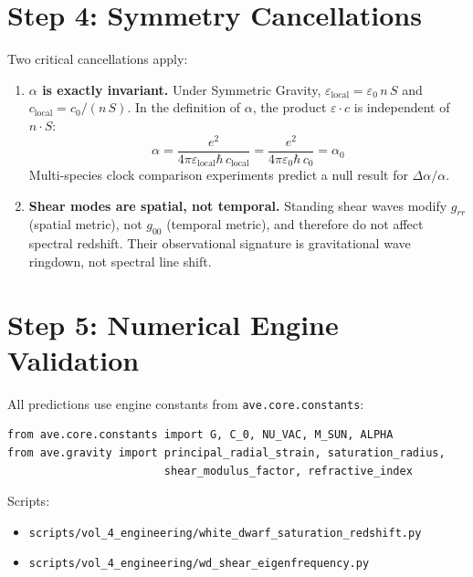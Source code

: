 \section{Step 4: Symmetry Cancellations}



\noindent
Two critical cancellations apply:

\begin{enumerate}
    \item \textbf{$\alpha$ is exactly invariant.}
    Under Symmetric Gravity, $\varepsilon_{\text{local}} = \varepsilon_0 \, n \, S$
    and $c_{\text{local}} = c_0 / (n \, S)$.
    In the definition of $\alpha$, the product $\varepsilon \cdot c$ is independent of $n \cdot S$:
    \begin{equation}
        \alpha = \frac{e^2}{4\pi \varepsilon_{\text{local}} \hbar \, c_{\text{local}}}
               = \frac{e^2}{4\pi \varepsilon_0 \hbar \, c_0} = \alpha_0
    \end{equation}
    Multi-species clock comparison experiments predict a null result for $\Delta\alpha / \alpha$.

    \item \textbf{Shear modes are spatial, not temporal.}
    Standing shear waves modify $g_{rr}$ (spatial metric),
    not $g_{00}$ (temporal metric), and therefore do not affect spectral redshift.
    Their observational signature is gravitational wave ringdown,
    not spectral line shift.
\end{enumerate}

\section{Step 5: Numerical Engine Validation}

All predictions use engine constants from \texttt{ave.core.constants}:
\begin{verbatim}
from ave.core.constants import G, C_0, NU_VAC, M_SUN, ALPHA
from ave.gravity import principal_radial_strain, saturation_radius,
                        shear_modulus_factor, refractive_index
\end{verbatim}

Scripts:
\begin{itemize}
    \item \texttt{scripts/vol\_4\_engineering/white\_dwarf\_saturation\_redshift.py}
    \item \texttt{scripts/vol\_4\_engineering/wd\_shear\_eigenfrequency.py}
\end{itemize}

